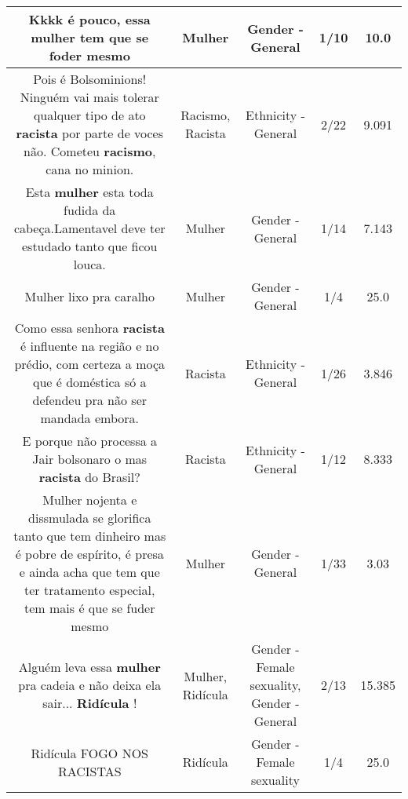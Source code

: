 \documentclass[11pt]{article}
\newlength\mylength
\begin{document}
\begin{center}
\begin{longtable}{|C{.65\mylength}|C{.30\mylength}|C{.12\mylength}|C{.12\mylength}|C{.12\mylength}|}
  \small Kkkk é pouco, essa \textbf{mulher} tem que se foder mesmo\normalsize   & Mulher & Gender - General & 1/10 & 10.0 \\  \hline
  \small Pois é Bolsominions! Ninguém vai mais tolerar qualquer tipo de ato \textbf{racista} por parte de voces não. Cometeu \textbf{racismo}, cana no minion.\normalsize   & Racismo, Racista & Ethnicity - General & 2/22 & 9.091 \\  \hline
  \small Esta \textbf{mulher} esta toda fudida da cabeça.Lamentavel deve ter estudado tanto  que ficou louca.\normalsize   & Mulher & Gender - General & 1/14 & 7.143 \\  \hline
  \small Mulher lixo pra caralho\normalsize   & Mulher & Gender - General & 1/4 & 25.0 \\  \hline
  \small Como essa senhora \textbf{racista} é influente na região e no prédio, com certeza a moça que é doméstica só a defendeu pra não ser mandada embora.\normalsize   & Racista & Ethnicity - General & 1/26 & 3.846 \\  \hline
  \small E porque não processa a Jair bolsonaro o mas \textbf{racista} do Brasil?\normalsize   & Racista & Ethnicity - General & 1/12 & 8.333 \\  \hline
  \small Mulher nojenta e dissmulada se glorifica tanto que tem dinheiro mas é pobre de espírito, é presa e ainda acha que tem que ter tratamento especial, tem mais é que se fuder mesmo\normalsize   & Mulher & Gender - General & 1/33 & 3.03 \\  \hline
  \small Alguém leva essa \textbf{mulher} pra cadeia e não deixa ela sair... \textbf{Ridícula} !\normalsize   & Mulher, Ridícula & Gender - Female sexuality, Gender - General & 2/13 & 15.385 \\  \hline
  \small Ridícula FOGO NOS RACISTAS\normalsize   & Ridícula & Gender - Female sexuality & 1/4 & 25.0 \\  \hline

\end{longtable}
\end{center}
\end{document}
